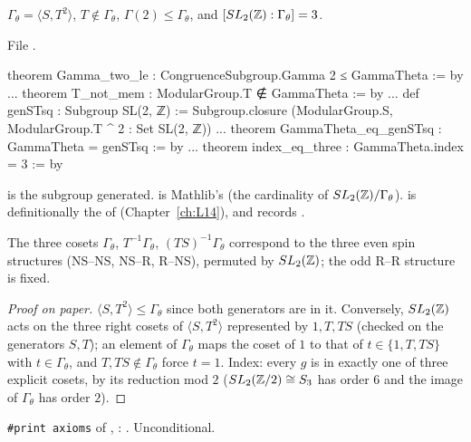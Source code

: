 \begin{theorem}\label{l17:thm:gammatheta}
$\Gamma_\theta=\langle S,T^2\rangle$, $T\notin\Gamma_\theta$, $\Gamma(2)\le\Gamma_\theta$, and
$[SL_2({\mathbb{Z}}):\Gamma_\theta]=3$.
\end{theorem}
\noindent File .
\begin{leancode}
theorem Gamma_two_le : CongruenceSubgroup.Gamma 2 ≤ GammaTheta := by
...
theorem T_not_mem : ModularGroup.T ∉ GammaTheta := by
...
def genSTsq : Subgroup SL(2, ℤ) :=
  Subgroup.closure ({ModularGroup.S, ModularGroup.T ^ 2} : Set SL(2, ℤ))
...
theorem GammaTheta_eq_genSTsq : GammaTheta = genSTsq := by
...
theorem index_eq_three : GammaTheta.index = 3 := by
\end{leancode}
\begin{dictionary}
 is the subgroup generated.  is Mathlib's 
(the cardinality of $SL_2({\mathbb{Z}})/\Gamma_\theta$).  is definitionally the 
of  (Chapter~\ref{ch:L14}), and
 records .
\end{dictionary}
\begin{physics}
The three cosets $\Gamma_\theta$, $T^{-1}\Gamma_\theta$, $(TS)^{-1}\Gamma_\theta$ correspond to the
three even spin structures (NS--NS, NS--R, R--NS), permuted by $SL_2({\mathbb{Z}})$; the odd R--R structure is
fixed.
\end{physics}
\begin{proof}[Proof on paper]
$\langle S,T^2\rangle\le\Gamma_\theta$ since both generators are in it. Conversely, $SL_2({\mathbb{Z}})$ acts on
the three right cosets of $\langle S,T^2\rangle$ represented by $1,T,TS$ (checked on the generators
$S,T$); an element of $\Gamma_\theta$ maps the coset of $1$ to that of $t\in\{1,T,TS\}$ with
$t\in\Gamma_\theta$, and $T,TS\notin\Gamma_\theta$ force $t=1$. Index: every $g$ is in exactly one of
three explicit cosets, by its reduction mod $2$ ($SL_2({\mathbb{Z}}/2)\cong S_3$ has order $6$ and the image of
$\Gamma_\theta$ has order $2$).
\end{proof}
\begin{status}
\texttt{\#print axioms} of ,
: . Unconditional.
\end{status}

